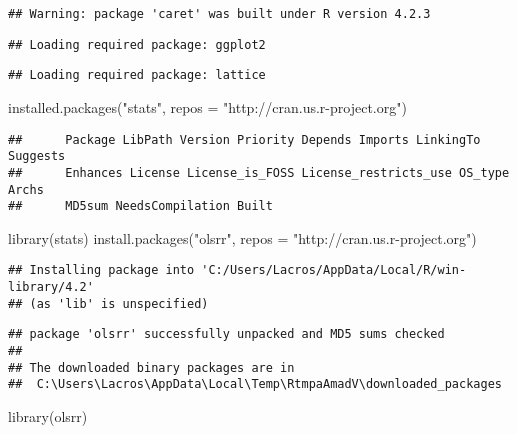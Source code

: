 \documentclass[
]{article}
\newenvironment{Shaded}{\begin{snugshade}}{\end{snugshade}}
\newcommand{\AttributeTok}[1]{\textcolor[rgb]{0.77,0.63,0.00}{#1}}
\newcommand{\FunctionTok}[1]{\textcolor[rgb]{0.00,0.00,0.00}{#1}}
\newcommand{\NormalTok}[1]{#1}
\newcommand{\StringTok}[1]{\textcolor[rgb]{0.31,0.60,0.02}{#1}}
\begin{document}
\begin{verbatim}
## Warning: package 'caret' was built under R version 4.2.3
\end{verbatim}

\begin{verbatim}
## Loading required package: ggplot2
\end{verbatim}

\begin{verbatim}
## Loading required package: lattice
\end{verbatim}

\begin{Shaded}
\begin{Highlighting}[]
\FunctionTok{installed.packages}\NormalTok{(}\StringTok{"stats"}\NormalTok{, }\AttributeTok{repos =} \StringTok{"http://cran.us.r{-}project.org"}\NormalTok{)}
\end{Highlighting}
\end{Shaded}

\begin{verbatim}
##      Package LibPath Version Priority Depends Imports LinkingTo Suggests
##      Enhances License License_is_FOSS License_restricts_use OS_type Archs
##      MD5sum NeedsCompilation Built
\end{verbatim}

\begin{Shaded}
\begin{Highlighting}[]
\FunctionTok{library}\NormalTok{(stats)}
\FunctionTok{install.packages}\NormalTok{(}\StringTok{"olsrr"}\NormalTok{, }\AttributeTok{repos =} \StringTok{"http://cran.us.r{-}project.org"}\NormalTok{)}
\end{Highlighting}
\end{Shaded}

\begin{verbatim}
## Installing package into 'C:/Users/Lacros/AppData/Local/R/win-library/4.2'
## (as 'lib' is unspecified)
\end{verbatim}

\begin{verbatim}
## package 'olsrr' successfully unpacked and MD5 sums checked
## 
## The downloaded binary packages are in
##  C:\Users\Lacros\AppData\Local\Temp\RtmpaAmadV\downloaded_packages
\end{verbatim}

\begin{Shaded}
\begin{Highlighting}[]
\FunctionTok{library}\NormalTok{(olsrr)}
\end{Highlighting}
\end{Shaded}
\end{document}

